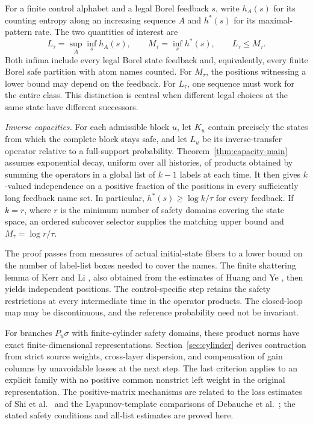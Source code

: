 \documentclass[11pt,reqno]{amsart}
\numberwithin{equation}{section}
\theoremstyle{definition}
\begin{document}
For a finite control alphabet and a legal Borel feedback $s$, write
$h_A(s)$ for its counting entropy
along an increasing sequence $A$ and $h^*(s)$ for its maximal-pattern
rate. The two quantities of interest are
\[
 L_\tau=\sup_A\inf_s h_A(s),\qquad
 M_\tau=\inf_s h^*(s),\qquad L_\tau\le M_\tau.
\]
Both infima include every legal Borel state feedback and, equivalently,
every finite Borel safe partition with atom names counted. For
$M_\tau$, the positions witnessing a lower bound may depend on the
feedback. For $L_\tau$, one sequence must work for the entire class.
This distinction is central when different legal choices at the same
state have different successors.

\emph{Inverse capacities.}
For each admissible block $u$, let $K_u$ contain precisely the states
from which the complete block stays safe, and let $L_u$ be its
inverse-transfer operator relative to a full-support probability.
Theorem~\ref{thm:capacity-main} assumes exponential decay, uniform over
all histories, of products obtained by summing the operators in a
global list of $k-1$ labels at each time. It then gives $k$-valued
independence on a positive fraction of the positions in every
sufficiently long feedback name set. In particular,
$h^*(s)\ge\log k/\tau$ for every feedback. If $k=r$, where $r$ is the
minimum number of safety domains covering the state space, an ordered
subcover selector supplies the matching upper bound and
$M_\tau=\log r/\tau$.

The proof passes from measures of actual initial-state fibers to a
lower bound on the number of label-list boxes needed to cover the
names. The finite shattering lemma of Kerr and Li
\cite[Lemma~3.3]{KL2007}, also obtained from the estimates of Huang
and Ye \cite[Lemma~4.1 and Remark~4.2]{HuangYe2009}, then yields
independent positions. The control-specific step retains the safety
restrictions at every intermediate time in the operator products.
The closed-loop map may be discontinuous, and the reference probability
need not be invariant.

For branches $P_u\sigma$ with finite-cylinder safety domains, these
product norms have exact finite-dimensional representations.
Section~\ref{sec:cylinder} derives contraction from strict source
weights, cross-layer dispersion, and compensation of gain columns by
unavoidable losses at the next step. The last criterion applies to
an explicit family with no positive common nonstrict left weight in
the original representation. The positive-matrix mechanisms are related
to the loss estimates of Shi et al.\ \cite{Shi2021} and the
Lyapunov-template comparisons of Debauche et al.\ \cite{Debauche2022};
the stated safety conditions and all-list estimates are proved here.
\end{document}
